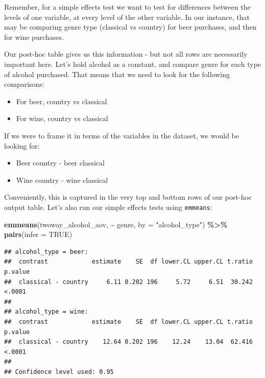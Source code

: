 \documentclass[
]{book}
\newenvironment{Shaded}{\begin{snugshade}}{\end{snugshade}}
\newcommand{\AttributeTok}[1]{\textcolor[rgb]{0.13,0.29,0.53}{#1}}
\newcommand{\ConstantTok}[1]{\textcolor[rgb]{0.56,0.35,0.01}{#1}}
\newcommand{\FunctionTok}[1]{\textcolor[rgb]{0.13,0.29,0.53}{\textbf{#1}}}
\newcommand{\NormalTok}[1]{#1}
\newcommand{\SpecialCharTok}[1]{\textcolor[rgb]{0.81,0.36,0.00}{\textbf{#1}}}
\newcommand{\StringTok}[1]{\textcolor[rgb]{0.31,0.60,0.02}{#1}}
\providecommand{\tightlist}{%
  \setlength{\itemsep}{0pt}\setlength{\parskip}{0pt}}
\begin{document}
Remember, for a simple effects test we want to test for differences between the levels of one variable, at every level of the other variable. In our instance, that may be comparing genre type (classical vs country) for beer purchases, and then for wine purchases.

Our post-hoc table gives us this information - but not all rows are necessarily important here. Let's hold alcohol as a constant, and compare genre for each type of alcohol purchased. That means that we need to look for the following comparisons:

\begin{itemize}
\tightlist
\item
  For beer, country vs classical
\item
  For wine, country vs classical
\end{itemize}

If we were to frame it in terms of the variables in the dataset, we would be looking for:

\begin{itemize}
\tightlist
\item
  Beer country - beer classical
\item
  Wine country - wine classical
\end{itemize}

Conveniently, this is captured in the very top and bottom rows of our post-hoc output table. Let's also run our simple effects tests using \texttt{emmeans}:

\begin{Shaded}
\begin{Highlighting}[]
\FunctionTok{emmeans}\NormalTok{(twoway\_alcohol\_aov, }\SpecialCharTok{\textasciitilde{}}\NormalTok{ genre, }\AttributeTok{by =} \StringTok{"alcohol\_type"}\NormalTok{) }\SpecialCharTok{\%\textgreater{}\%}
  \FunctionTok{pairs}\NormalTok{(}\AttributeTok{infer =} \ConstantTok{TRUE}\NormalTok{)}
\end{Highlighting}
\end{Shaded}

\begin{verbatim}
## alcohol_type = beer:
##  contrast            estimate    SE  df lower.CL upper.CL t.ratio p.value
##  classical - country     6.11 0.202 196     5.72     6.51  30.242  <.0001
## 
## alcohol_type = wine:
##  contrast            estimate    SE  df lower.CL upper.CL t.ratio p.value
##  classical - country    12.64 0.202 196    12.24    13.04  62.416  <.0001
## 
## Confidence level used: 0.95
\end{verbatim}
\end{document}
